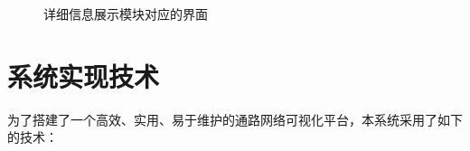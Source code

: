 \begin{figure}[h]{\label{juti}}
\begin{minipage}{1.0\linewidth}
\begin{minipage}{\textwidth}
      \subfigure{\label{juti4}}\addtocounter{subfigure}{-2}
      \subfigure{\label{j5}}\addtocounter{subfigure}{-2}
      \subfigure{\label{j6}}\addtocounter{subfigure}{-2}
    \end{minipage}
	\caption[juti]{详细信息展示模块对应的界面}
	\label{juti}
  \end{minipage}
\end{figure}



\section{系统实现技术}
为了搭建了一个高效、实用、易于维护的通路网络可视化平台，本系统采用了如下的技术：

